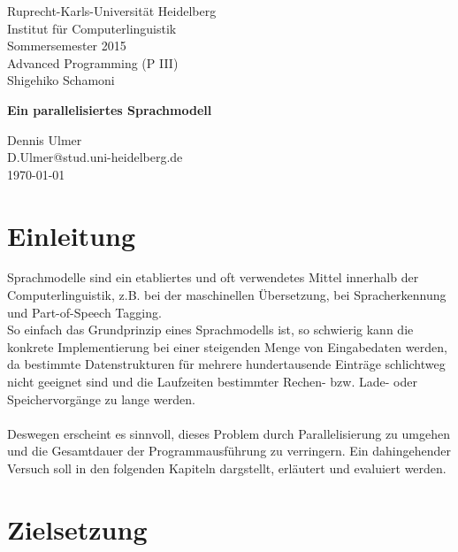 \documentclass[a4paper,12pt]{scrartcl}
\begin{document}
\begin{titlepage}
\begin{small}
\vfill {Ruprecht-Karls-Universität Heidelberg\\ 
Institut für Computerlinguistik\\ 
Sommersemester 2015\\
Advanced Programming (P III) \\
Shigehiko Schamoni}
\end{small}


\begin{center}
\begin{Large}
\vfill {\textsf{\textbf{
Ein parallelisiertes Sprachmodell
}}}
\end{Large}
\end{center}

\begin{small}
\vfill
Dennis Ulmer \\
D.Ulmer@stud.uni-heidelberg.de \\
\today
\end{small}

\end{titlepage}


\tableofcontents
\newpage
\thispagestyle{empty}

\section{Einleitung}

    Sprachmodelle sind ein etabliertes und oft verwendetes Mittel innerhalb der Computerlinguistik, z.B. bei der maschinellen Übersetzung, bei Spracherkennung und Part-of-Speech Tagging. \\
    So einfach das Grundprinzip eines Sprachmodells ist, so schwierig kann die konkrete Implementierung bei einer steigenden Menge von Eingabedaten werden, da bestimmte Datenstrukturen für mehrere hundertausende Einträge schlichtweg nicht geeignet sind und die Laufzeiten bestimmter Rechen- bzw. Lade- oder Speichervorgänge zu lange werden. \\ \\
    Deswegen erscheint es sinnvoll, dieses Problem durch Parallelisierung zu umgehen und die Gesamtdauer der Programmausführung zu verringern. Ein dahingehender Versuch soll in den folgenden Kapiteln dargstellt, erläutert und evaluiert werden.

\section{Zielsetzung}
\end{document}
